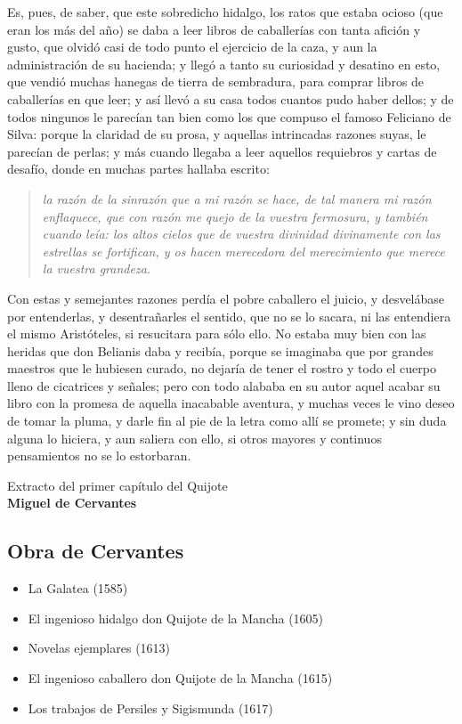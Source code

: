 \documentclass[a4paper, 12pt, twoside]{article} %
\begin{document}
Es, pues, de saber, que este sobredicho hidalgo, los ratos que estaba ocioso (que eran los más del año) se daba a leer libros de caballerías con tanta afición y gusto, que olvidó casi de todo punto el ejercicio de la caza, y aun la administración de su hacienda; y llegó a tanto su curiosidad y desatino en esto, que vendió muchas hanegas de tierra de sembradura, para comprar libros de caballerías en que leer; y así llevó a su casa todos cuantos pudo haber dellos; y de todos ningunos le parecían tan bien como los que compuso el famoso Feliciano de Silva: porque la claridad de su prosa, y aquellas intrincadas razones suyas, le parecían de perlas; y más cuando llegaba a leer aquellos requiebros y cartas de desafío, donde en muchas partes hallaba escrito: 
\begin{quote}
  \itshape
la razón de la sinrazón que a mi razón se hace, de tal manera mi razón enflaquece, que con razón me quejo de la vuestra fermosura, y también cuando leía: los altos cielos que de vuestra divinidad divinamente con las estrellas se fortifican, y os hacen merecedora del merecimiento que merece la vuestra grandeza. 
\end{quote}
Con estas y semejantes razones perdía el pobre caballero el juicio, y desvelábase por entenderlas, y desentrañarles el sentido, que no se lo sacara, ni las entendiera el mismo Aristóteles, si resucitara para sólo ello. No estaba muy bien con las heridas que don Belianis daba y recibía, porque se imaginaba que por grandes maestros que le hubiesen curado, no dejaría de tener el rostro y todo el cuerpo lleno de cicatrices y señales; pero con todo alababa en su autor aquel acabar su libro con la promesa de aquella inacabable aventura, y muchas veces le vino deseo de tomar la pluma, y darle fin al pie de la letra como allí se promete; y sin duda alguna lo hiciera, y aun saliera con ello, si otros mayores y continuos pensamientos no se lo estorbaran.

\begin{flushright}
Extracto del primer capítulo del Quijote\\
\textbf{Miguel de Cervantes}
\end{flushright}


\subsection{Obra de Cervantes}

\begin{itemize}
  \item La Galatea (1585)
  \item El ingenioso hidalgo don Quijote de la Mancha (1605)
  \item Novelas ejemplares (1613)
  \item El ingenioso caballero don Quijote de la Mancha (1615)
  \item Los trabajos de Persiles y Sigismunda (1617)
\end{itemize}
\end{document}
